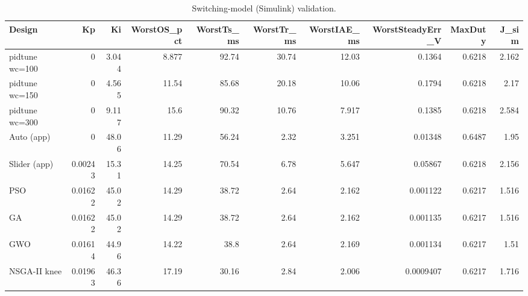 \begin{table}[t]
\centering\caption{Switching-model (Simulink) validation.}\label{tab:sim}
\begin{tabular}{lrrrrrrrrr}
\toprule
Design & Kp & Ki & WorstOS\_pct & WorstTs\_ms & WorstTr\_ms & WorstIAE\_ms & WorstSteadyErr\_V & MaxDuty & J\_sim \\
\midrule
pidtune wc=100 & 0 & 3.044 & 8.877 & 92.74 & 30.74 & 12.03 & 0.1364 & 0.6218 & 2.162 \\
pidtune wc=150 & 0 & 4.565 & 11.54 & 85.68 & 20.18 & 10.06 & 0.1794 & 0.6218 & 2.17 \\
pidtune wc=300 & 0 & 9.117 & 15.6 & 90.32 & 10.76 & 7.917 & 0.1385 & 0.6218 & 2.584 \\
Auto (app) & 0 & 48.06 & 11.29 & 56.24 & 2.32 & 3.251 & 0.01348 & 0.6487 & 1.95 \\
Slider (app) & 0.00243 & 15.31 & 14.25 & 70.54 & 6.78 & 5.647 & 0.05867 & 0.6218 & 2.156 \\
PSO & 0.01622 & 45.02 & 14.29 & 38.72 & 2.64 & 2.162 & 0.001122 & 0.6217 & 1.516 \\
GA & 0.01622 & 45.02 & 14.29 & 38.72 & 2.64 & 2.162 & 0.001135 & 0.6217 & 1.516 \\
GWO & 0.01614 & 44.96 & 14.22 & 38.8 & 2.64 & 2.169 & 0.001134 & 0.6217 & 1.51 \\
NSGA-II knee & 0.01963 & 46.36 & 17.19 & 30.16 & 2.84 & 2.006 & 0.0009407 & 0.6217 & 1.716 \\
\bottomrule
\end{tabular}
\end{table}
